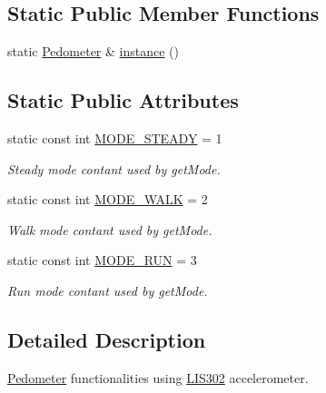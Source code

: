 \subsection*{Static Public Member Functions}
\begin{DoxyCompactItemize}
\item 
static \hyperlink{class_pedometer}{Pedometer} \& \hyperlink{class_pedometer_a0c788457ae234fd7dd76f73fa1455036}{instance} ()
\end{DoxyCompactItemize}
\subsection*{Static Public Attributes}
\begin{DoxyCompactItemize}
\item 
\hypertarget{class_pedometer_a27aa2aacbeef562588658b858085c930}{static const int \hyperlink{class_pedometer_a27aa2aacbeef562588658b858085c930}{M\-O\-D\-E\-\_\-\-S\-T\-E\-A\-D\-Y} = 1}\label{class_pedometer_a27aa2aacbeef562588658b858085c930}

\begin{DoxyCompactList}\small\item\em Steady mode contant used by get\-Mode. \end{DoxyCompactList}\item 
\hypertarget{class_pedometer_ae30e2fdb9a7d8b1a9b7c3be5b231df97}{static const int \hyperlink{class_pedometer_ae30e2fdb9a7d8b1a9b7c3be5b231df97}{M\-O\-D\-E\-\_\-\-W\-A\-L\-K} = 2}\label{class_pedometer_ae30e2fdb9a7d8b1a9b7c3be5b231df97}

\begin{DoxyCompactList}\small\item\em Walk mode contant used by get\-Mode. \end{DoxyCompactList}\item 
\hypertarget{class_pedometer_a46947e1b0c6ae23f8279047a03b06048}{static const int \hyperlink{class_pedometer_a46947e1b0c6ae23f8279047a03b06048}{M\-O\-D\-E\-\_\-\-R\-U\-N} = 3}\label{class_pedometer_a46947e1b0c6ae23f8279047a03b06048}

\begin{DoxyCompactList}\small\item\em Run mode contant used by get\-Mode. \end{DoxyCompactList}\end{DoxyCompactItemize}


\subsection{Detailed Description}
\hyperlink{class_pedometer}{Pedometer} functionalities using \hyperlink{class_l_i_s302}{L\-I\-S302} accelerometer. 


